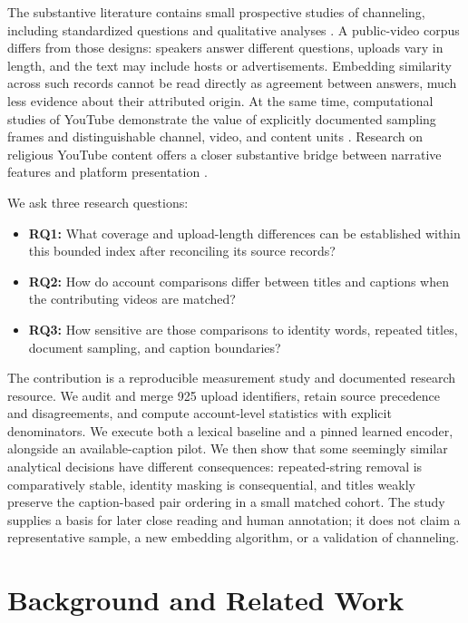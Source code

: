 The substantive literature contains small prospective studies of channeling, including standardized questions and qualitative analyses \citep{anastasia2020qualitative,wahbeh2023answers,wahbeh2026semantic,wahbeh2026qualitative}. A public-video corpus differs from those designs: speakers answer different questions, uploads vary in length, and the text may include hosts or advertisements. Embedding similarity across such records cannot be read directly as agreement between answers, much less evidence about their attributed origin. At the same time, computational studies of YouTube demonstrate the value of explicitly documented sampling frames and distinguishable channel, video, and content units \citep{ribeiro2021youniverse}. Research on religious YouTube content offers a closer substantive bridge between narrative features and platform presentation \citep{chen2026digital}.

We ask three research questions:
\begin{itemize}
\item \textbf{RQ1:} What coverage and upload-length differences can be established within this bounded index after reconciling its source records?
\item \textbf{RQ2:} How do account comparisons differ between titles and captions when the contributing videos are matched?
\item \textbf{RQ3:} How sensitive are those comparisons to identity words, repeated titles, document sampling, and caption boundaries?
\end{itemize}

The contribution is a reproducible measurement study and documented research resource. We audit and merge 925 upload identifiers, retain source precedence and disagreements, and compute account-level statistics with explicit denominators. We execute both a lexical baseline and a pinned learned encoder, alongside an available-caption pilot. We then show that some seemingly similar analytical decisions have different consequences: repeated-string removal is comparatively stable, identity masking is consequential, and titles weakly preserve the caption-based pair ordering in a small matched cohort. The study supplies a basis for later close reading and human annotation; it does not claim a representative sample, a new embedding algorithm, or a validation of channeling.

\section{Background and Related Work}
